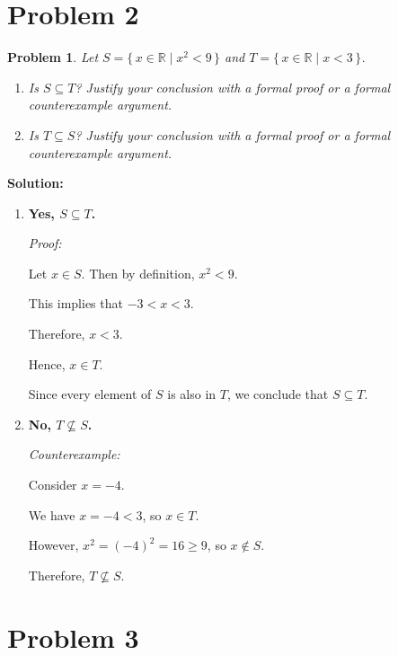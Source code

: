 \documentclass[12pt]{article}
\newtheorem{problem}{Problem}
\theoremstyle{definition}
\begin{document}
\newpage

\section*{Problem 2}

\begin{problem}
Let $S = \{\, x \in \mathbb{R} \mid x^2 < 9 \,\}$ and $T = \{\, x \in \mathbb{R} \mid x < 3 \,\}$.

\begin{enumerate}[label=(\alph*)]
    \item Is $S \subseteq T$? Justify your conclusion with a formal proof or a formal counterexample argument.

    \item Is $T \subseteq S$? Justify your conclusion with a formal proof or a formal counterexample argument.
\end{enumerate}
\end{problem}

\textbf{Solution:}

\begin{enumerate}[label=(\alph*)]
    \item \textbf{Yes, $S \subseteq T$.}

    \textit{Proof:}

    Let $x \in S$. Then by definition, $x^2 < 9$.

    This implies that $-3 < x < 3$.

    Therefore, $x < 3$.

    Hence, $x \in T$.

    Since every element of $S$ is also in $T$, we conclude that $S \subseteq T$.

    \item \textbf{No, $T \nsubseteq S$.}

    \textit{Counterexample:}

    Consider $x = -4$.

    We have $x = -4 < 3$, so $x \in T$.

    However, $x^2 = (-4)^2 = 16 \geq 9$, so $x \notin S$.

    Therefore, $T \nsubseteq S$.
\end{enumerate}

\newpage

\section*{Problem 3}
\end{document}
